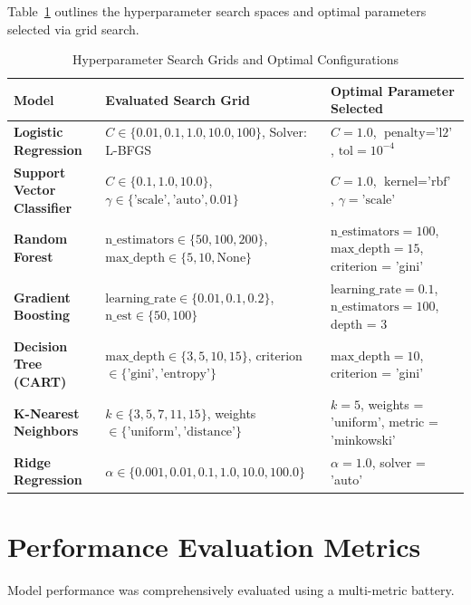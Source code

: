 \documentclass[12pt,a4paper,oneside]{report}
\begin{document}
Table~\ref{tab:hyperparameters} outlines the hyperparameter search spaces and optimal parameters selected via grid search.

\begin{table}[H]
\centering
\caption{Hyperparameter Search Grids and Optimal Configurations}
\label{tab:hyperparameters}
\small
\begin{tabularx}{\textwidth}{lp{5.0cm}X}
\toprule
\textbf{Model} & \textbf{Evaluated Search Grid} & \textbf{Optimal Parameter Selected} \\
\midrule
\textbf{Logistic Regression} & $C \in \{0.01, 0.1, 1.0, 10.0, 100\}$, Solver: L-BFGS & $C = 1.0$, $\text{penalty} = \text{'l2'}$, $\text{tol} = 10^{-4}$ \\
\textbf{Support Vector Classifier} & $C \in \{0.1, 1.0, 10.0\}$, $\gamma \in \{\text{'scale'}, \text{'auto'}, 0.01\}$ & $C = 1.0$, $\text{kernel} = \text{'rbf'}$, $\gamma = \text{'scale'}$ \\
\textbf{Random Forest} & $\text{n\_estimators} \in \{50, 100, 200\}$, $\text{max\_depth} \in \{5, 10, \text{None}\}$ & $\text{n\_estimators} = 100$, $\text{max\_depth} = 15$, criterion = 'gini' \\
\textbf{Gradient Boosting} & $\text{learning\_rate} \in \{0.01, 0.1, 0.2\}$, $\text{n\_est} \in \{50, 100\}$ & $\text{learning\_rate} = 0.1$, $\text{n\_estimators} = 100$, depth = 3 \\
\textbf{Decision Tree (CART)} & $\text{max\_depth} \in \{3, 5, 10, 15\}$, criterion $\in \{\text{'gini'}, \text{'entropy'}\}$ & $\text{max\_depth} = 10$, criterion = 'gini' \\
\textbf{K-Nearest Neighbors} & $k \in \{3, 5, 7, 11, 15\}$, weights $\in \{\text{'uniform'}, \text{'distance'}\}$ & $k = 5$, weights = 'uniform', metric = 'minkowski' \\
\textbf{Ridge Regression} & $\alpha \in \{0.001, 0.01, 0.1, 1.0, 10.0, 100.0\}$ & $\alpha = 1.0$, solver = 'auto' \\
\bottomrule
\end{tabularx}
\end{table}

\section{Performance Evaluation Metrics}
\label{sec:evaluation_metrics}
Model performance was comprehensively evaluated using a multi-metric battery.
\end{document}
